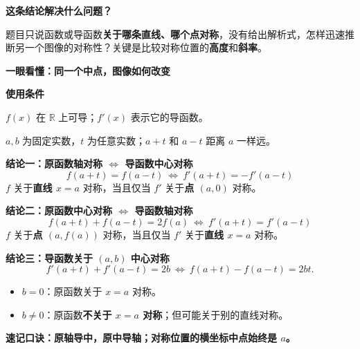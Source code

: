 \begin{statementbox}
  \textbf{\textcolor{CStatement}{这条结论解决什么问题？}}\par\nopagebreak[4]

  题目只说函数或导函数\textbf{关于哪条直线、哪个点对称}，没有给出解析式，怎样迅速推断另一个图像的对称性？关键是比较对称位置的\textbf{高度}和\textbf{斜率}。

  \textbf{\textcolor{CStatement}{一眼看懂：同一个中点，图像如何改变}}\par\nopagebreak[4]
\begin{center}

\end{center}

  \medskip
  \textbf{\textcolor{CStatement}{使用条件}}
  \begin{description}[style=nextline,leftmargin=2.8em,labelsep=0.5em,itemsep=0.35em]
    \item[\textbf{条件一（可导）：}] $f(x)$ 在 $\mathbb R$ 上可导；$f'(x)$ 表示它的导函数。
    \item[\textbf{条件二（对称位置）：}] $a,b$ 为固定实数，$t$ 为任意实数；$a+t$ 和 $a-t$ 距离 $a$ 一样远。
  \end{description}

  \medskip
  \textbf{\textcolor{CStatement}{结论一：原函数轴对称 $\Longleftrightarrow$ 导函数中心对称}}
  \[
    \boxed{f(a+t)=f(a-t)\ \Longleftrightarrow\ f'(a+t)=-f'(a-t)}
  \]
  $f$ 关于\textbf{直线 $x=a$} 对称，当且仅当 $f'$ 关于\textbf{点 $(a,0)$} 对称。

  \medskip
  \textbf{\textcolor{CStatement}{结论二：原函数中心对称 $\Longleftrightarrow$ 导函数轴对称}}
  \[
    \boxed{f(a+t)+f(a-t)=2f(a)\ \Longleftrightarrow\ f'(a+t)=f'(a-t)}
  \]
  $f$ 关于\textbf{点 $(a,f(a))$} 对称，当且仅当 $f'$ 关于\textbf{直线 $x=a$} 对称。

  \medskip
  \textbf{\textcolor{CStatement}{结论三：导函数关于 $(a,b)$ 中心对称}}
  \[
    f'(a+t)+f'(a-t)=2b
    \ \Longleftrightarrow\ 
    \boxed{f(a+t)-f(a-t)=2bt}.
  \]
  \begin{itemize}[leftmargin=*,itemsep=0.25em,topsep=0.2em]
    \item $b=0$：原函数关于 $x=a$ 对称。
    \item $b\ne0$：原函数\textbf{不关于 $x=a$ 对称}；但可能关于别的直线对称。
  \end{itemize}

  \medskip
  \textbf{\textcolor{CStatement}{速记口诀：}}\textbf{原轴导中，原中导轴；对称位置的横坐标中点始终是 $a$。}
\end{statementbox}
